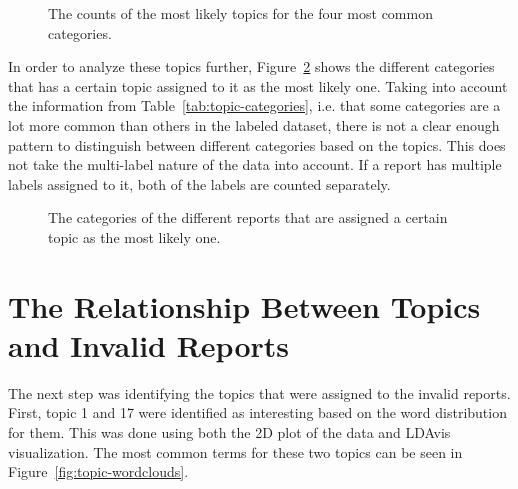 \begin{figure}[h!]
    \centering
    \quad
    \caption{The counts of the most likely topics for the four most common categories.}
    \label{fig:category-label-distribution}
\end{figure}

In order to analyze these topics further, Figure~\ref{fig:topic-category-distribution} shows the different categories that has a certain topic assigned to it as the most likely one.
Taking into account the information from Table~\ref{tab:topic-categories}, i.e. that some categories are a lot more common than others in the labeled dataset, there is not a clear enough pattern to distinguish between different categories based on the topics.
This does not take the multi-label nature of the data into account.
If a report has multiple labels assigned to it, both of the labels are counted separately.

\begin{figure}[h!]
    \centering
    \quad
    \caption{The categories of the different reports that are assigned a certain topic as the most likely one.}
    \label{fig:topic-category-distribution}
\end{figure}

\section{The Relationship Between Topics and Invalid Reports}
\label{sec:topic-invalid}

The next step was identifying the topics that were assigned to the invalid reports.
First, topic 1 and 17 were identified as interesting based on the word distribution for them.
This was done using both the 2D plot of the data and LDAvis visualization.
The most common terms for these two topics can be seen in Figure~\ref{fig:topic-wordclouds}.

